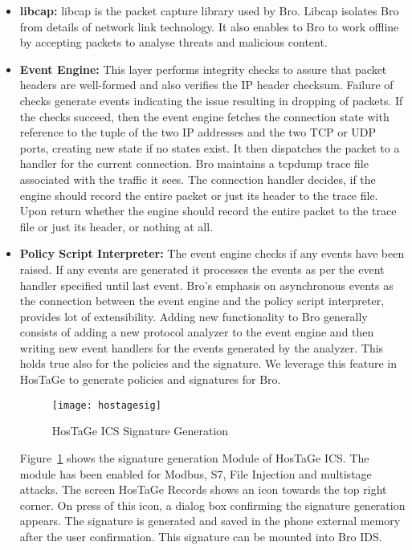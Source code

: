 \documentclass[article,msc=informatik,type=msc,colorback,accentcolor=tud9c]{tudthesis}
\begin{document}
		\begin{itemize}
		
		
		\item\textbf{libcap:} libcap is the packet capture library used by Bro. Libcap isolates Bro from details of network link technology. It also enables to Bro to work offline by accepting packets to analyse threats and malicious content.
		
		\item\textbf{Event Engine:} This layer performs integrity checks to assure that packet headers are well-formed and also verifies the \ac{IP} header checksum. Failure of checks generate events indicating the issue resulting in dropping of packets. If the checks succeed, then the event engine fetches the connection state with reference to the tuple of the two \ac{IP} addresses and the two TCP or UDP ports, creating new state if no states exist. It then dispatches the packet to a handler for the current connection. Bro maintains a tcpdump trace file associated with the traffic it sees. The connection handler decides, if the engine should record the entire packet or just its header to the trace file. Upon return whether the engine should record the entire packet to the trace file or just its header, or nothing at all.
		
		\item\textbf{Policy Script Interpreter:}
		The event engine checks if any events have been raised. If any events are generated it processes the events as per the event handler specified until last event.  Bro's emphasis on asynchronous events as the connection between the event engine and the policy script interpreter, provides lot of extensibility. Adding new functionality to Bro generally consists of adding a new protocol analyzer to the event engine and then writing new event handlers for the events generated by the analyzer. This holds true also for the policies and the signature. We  leverage this feature in HosTaGe to generate policies and signatures for Bro.
		
		
		\begin{figure}[H]
		\centering
		\texttt{[image: hostagesig]}
		\caption[HosTaGe ICS Signature Generation]{\label{f:HosTaGe ICS Signature Generation}HosTaGe ICS Signature Generation}	\end{figure}
		
		Figure~\ref{f:HosTaGe ICS Signature Generation} shows the signature generation Module of HosTaGe ICS. The module has been enabled for Modbus, S7, File Injection and multistage attacks. The screen HosTaGe Records shows an icon towards the top right corner. On press of this icon, a dialog box confirming the signature generation appears. The signature is generated and saved in the phone external memory after the user confirmation. This signature can be mounted into Bro IDS.
		
		
		
		\end{itemize} 
		
\end{document}
